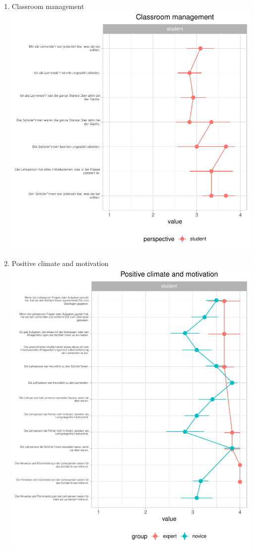 \documentclass[
  english,
  man,floatsintext]{apa6}
\providecommand{\tightlist}{%
  \setlength{\itemsep}{0pt}\setlength{\parskip}{0pt}}
\begin{document}
\begin{enumerate}
\def\labelenumi{(\arabic{enumi})}
\tightlist
\item
  Classroom management
  \includegraphics{paper_1_supplement_new_table_files/figure-latex/Line Plots Classroom Management-1.pdf}
  \newpage
\item
  Positive climate and motivation
  \includegraphics{paper_1_supplement_new_table_files/figure-latex/Positive climate and motivation line plots-1.pdf}

\end{enumerate}
\end{document}
